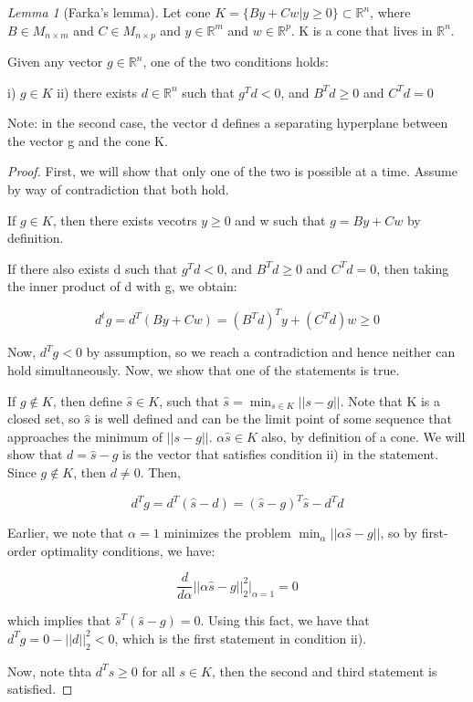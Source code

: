 \documentclass[class=article, crop=false]{standalone}
\theoremstyle{definition}
\theoremstyle{remark}
\theoremstyle{lemma}
\newtheorem*{lemma}{Lemma}
\theoremstyle{theorem}
\theoremstyle{corollary}
\theoremstyle{property}
\begin{document}
			\begin{lemma} [Farka's lemma]
				Let cone $K = \{By + Cw | y \ge 0\} \subset \mathbb{R}^n$, where $B \in M_{n \times m}$ and $C \in M_{n \times p}$ and $y \in \mathbb{R}^m$ and $w \in \mathbb{R}^p$. K is a cone that lives in $\mathbb{R}^n$.

				Given any vector $g \in \mathbb{R}^n$, one of the two conditions holds:

				i) $g \in K$
				ii) there exists $d \in \mathbb{R}^n$ such that $g^T d < 0$, and $B^T d \ge 0$ and $C^T d = 0$

				Note: in the second case, the vector d defines a separating hyperplane between the vector g and the cone K.
			\end{lemma}
			\begin{proof}
				First, we will show that only one of the two is possible at a time. Assume by way of contradiction that both hold.

				If $g \in K$, then there exists vecotrs $y \ge 0$ and w such that $g = By + Cw$ by definition. 

				If there also exists d such that $g^T d < 0$, and $B^T d \ge 0$ and $C^T d = 0$, then taking the inner product of d with g, we obtain:

					$$d^t g = d^T (By + Cw) = (B^Td)^T y + (C^Td)w \ge 0$$

				Now, $d^T g < 0$ by assumption, so we reach a contradiction and hence neither can hold simultaneously. Now, we show that one of the statements is true. 

				If $g \notin K$, then define $\hat{s} \in K$, such that $\hat{s} = \min_{s \in K} ||s - g||$. Note that K is a closed set, so $\hat{s}$ is well defined and can be the limit point of some sequence that approaches the minimum of $||s -g||$. $\alpha \hat{s} \in K$ also, by definition of a cone. We will show that $d = \hat{s} - g$ is the vector that satisfies condition ii) in the statement. Since $g \notin K$, then $d \neq 0$. Then, 

					$$d^Tg = d^T(\hat{s} - d) = (\hat{s} - g)^T \hat{s} - d^T d$$

				Earlier, we note that $\alpha = 1$ minimizes the problem $\min_\alpha ||\alpha \hat{s} - g||$, so by first-order optimality conditions, we have:

					$$\frac{d}{d\alpha} ||\alpha \hat{s} - g||_2^2|_{\alpha=1} = 0$$

				which implies that $\hat{s}^T (\hat{s} - g) = 0$. Using this fact, we have that $d^Tg = 0 - ||d||_2^2 < 0$, which is the first statement in condition ii).

				Now, note thta $d^T s \ge 0$ for all $s \in K$, then the second and third statement is satisfied. 
			\end{proof}
\end{document}
